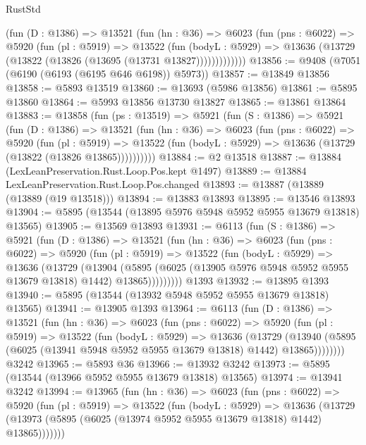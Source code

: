\begin{lexlean}{RustStd}
\begin{coremodule}
{{          (fun (D : @1386) =>
          @13521
            (fun (hn : @36) =>
            @6023
              (fun (pns : @6022) =>
              @5920
                (fun (pl : @5919) =>
                @13522
                  (fun (bodyL : @5929) =>
                  @13636 (@13729 (@13822 (@13826 (@13695 (@13731 @13827)))))))))))))
@13856 := @9408 (@7051 (@6190 (@6193 (@6195 @646 @6198)) @5973))
@13857 := @13849 @13856
@13858 := @5893 @13519
@13860 := @13693 (@5986 @13856)
@13861 := @5895 @13860
@13864 := @5993 @13856 @13730 @13827
@13865 := @13861 @13864
@13883 := @13858
    (fun (ps : @13519) =>
    @5921
      (fun (S : @1386) =>
      @5921
        (fun (D : @1386) =>
        @13521
          (fun (hn : @36) =>
          @6023
            (fun (pns : @6022) =>
            @5920
              (fun (pl : @5919) =>
              @13522 (fun (bodyL : @5929) => @13636 (@13729 (@13822 (@13826 @13865))))))))))
@13884 := @2 @13518
@13887 := @13884 (LexLeanPreservation.Rust.Loop.Pos.kept @1497)
@13889 := @13884 LexLeanPreservation.Rust.Loop.Pos.changed
@13893 := @13887 (@13889 (@13889 (@19 @13518)))
@13894 := @13883 @13893
@13895 := @13546 @13893
@13904 := @5895 (@13544 (@13895 @5976 @5948 @5952 @5955 @13679 @13818) @13565)
@13905 := @13569 @13893
@13931 := @6113
    (fun (S : @1386) =>
    @5921
      (fun (D : @1386) =>
      @13521
        (fun (hn : @36) =>
        @6023
          (fun (pns : @6022) =>
          @5920
            (fun (pl : @5919) =>
            @13522
              (fun (bodyL : @5929) =>
              @13636
                (@13729
                  (@13904
                    (@5895
                      (@6025 (@13905 @5976 @5948 @5952 @5955 @13679 @13818) @1442)
                      @13865)))))))))
    @1393
@13932 := @13895 @1393
@13940 := @5895 (@13544 (@13932 @5948 @5952 @5955 @13679 @13818) @13565)
@13941 := @13905 @1393
@13964 := @6113
    (fun (D : @1386) =>
    @13521
      (fun (hn : @36) =>
      @6023
        (fun (pns : @6022) =>
        @5920
          (fun (pl : @5919) =>
          @13522
            (fun (bodyL : @5929) =>
            @13636
              (@13729
                (@13940 (@5895 (@6025 (@13941 @5948 @5952 @5955 @13679 @13818) @1442) @13865))))))))
    @3242
@13965 := @5893 @36
@13966 := @13932 @3242
@13973 := @5895 (@13544 (@13966 @5952 @5955 @13679 @13818) @13565)
@13974 := @13941 @3242
@13994 := @13965
    (fun (hn : @36) =>
    @6023
      (fun (pns : @6022) =>
      @5920
        (fun (pl : @5919) =>
        @13522
          (fun (bodyL : @5929) =>
          @13636
            (@13729 (@13973 (@5895 (@6025 (@13974 @5952 @5955 @13679 @13818) @1442) @13865)))))))
}}
\end{coremodule}
\end{lexlean}
